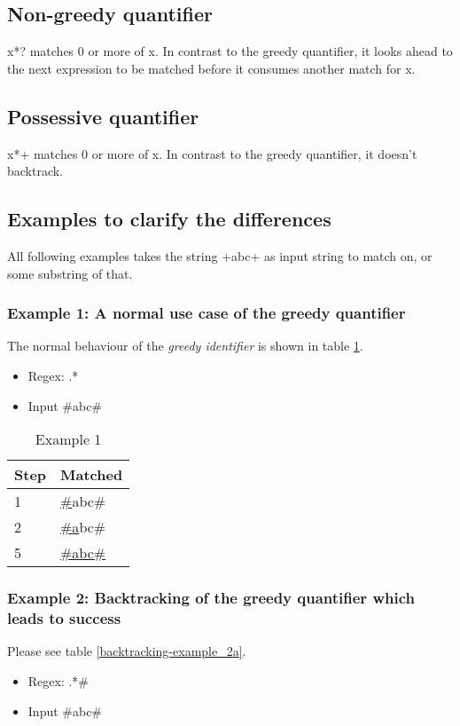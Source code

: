 \subsection{Non-greedy quantifier}

x*? matches 0 or more of x. In contrast to the greedy quantifier, it looks ahead to the next expression to be matched before it consumes another match for x.

\subsection{Possessive quantifier}

x*+ matches 0 or more of x. In contrast to the greedy quantifier, it doesn't backtrack.

\subsection{Examples to clarify the differences}

All following examples takes the string +abc+ as input string to match on, or some substring of that.

\subsubsection{Example 1: A normal use case of the greedy quantifier}
The normal behaviour of the \textit{greedy identifier} is shown in table \ref{backtracking-example_1}.
\begin{itemize}
\item Regex: .*
\item Input \#abc\#
\end{itemize}

\begin{table}[!ht]
\center
\begin{tabular}{|l|l|}
	\hline 
	Step & Matched \\ \hline
	1 & \underline{\#}abc\# \\ \hline
	2 & \underline{\#a}bc\# \\ \hline
	5 & \underline{\#abc\#} \\ 
	\hline
\end{tabular}
\caption{Example 1}\label{backtracking-example_1}
\end{table}

\subsubsection{Example 2: Backtracking of the greedy quantifier which leads to success}
Please see table \ref{backtracking-example_2a}.
\begin{itemize}
\item Regex: .*\#
\item Input \#abc\#
\end{itemize}

